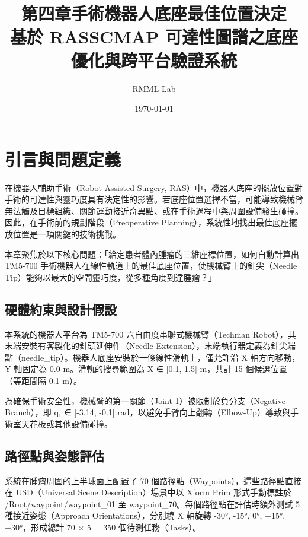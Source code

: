 \documentclass[a4paper, 12pt]{article}
\title{%
    \textbf{第四章\quad 手術機器人底座最佳位置決定} \\[8pt]
    \large 基於 RASSCMAP 可達性圖譜之底座優化與跨平台驗證系統
}
\author{RMML Lab}
\date{\today}
\begin{document}
\maketitle
\tableofcontents
\newpage

\section{引言與問題定義}
\label{sec:introduction}

在機器人輔助手術（Robot-Assisted Surgery, RAS）中，機器人底座的擺放位置對手術的可達性與靈巧度具有決定性的影響。若底座位置選擇不當，可能導致機械臂無法觸及目標組織、關節運動接近奇異點、或在手術過程中與周圍設備發生碰撞。因此，在手術前的規劃階段（Preoperative Planning），系統性地找出最佳底座擺放位置是一項關鍵的技術挑戰。

本章聚焦於以下核心問題：「給定患者體內腫瘤的三維座標位置，如何自動計算出 TM5-700 手術機器人在線性軌道上的最佳底座位置，使機械臂上的針尖（Needle Tip）能夠以最大的空間靈巧度，從多種角度到達腫瘤？」

\subsection{硬體約束與設計假設}

本系統的機器人平台為 TM5-700 六自由度串聯式機械臂（Techman Robot），其末端安裝有客製化的針頭延伸件（Needle Extension），末端執行器定義為針尖端點（needle\_tip）。機器人底座安裝於一條線性滑軌上，僅允許沿 X 軸方向移動，Y 軸固定為 0.0 m。滑軌的搜尋範圍為 X ∈ [0.1, 1.5] m，共計 15 個候選位置（等距間隔 0.1 m）。

為確保手術安全性，機械臂的第一關節（Joint 1）被限制於負分支（Negative Branch），即 q₁ ∈ [-3.14, -0.1] rad，以避免手臂向上翻轉（Elbow-Up）導致與手術室天花板或其他設備碰撞。

\subsection{路徑點與姿態評估}

系統在腫瘤周圍的上半球面上配置了 70 個路徑點（Waypoints），這些路徑點直接在 USD（Universal Scene Description）場景中以 Xform Prim 形式手動標註於 /Root/waypoint/waypoint\_01 至 waypoint\_70。每個路徑點在評估時額外測試 5 種接近姿態（Approach Orientations），分別繞 X 軸旋轉 {-30°, -15°, 0°, +15°, +30°}，形成總計 70 × 5 = 350 個待測任務（Tasks）。
\end{document}
